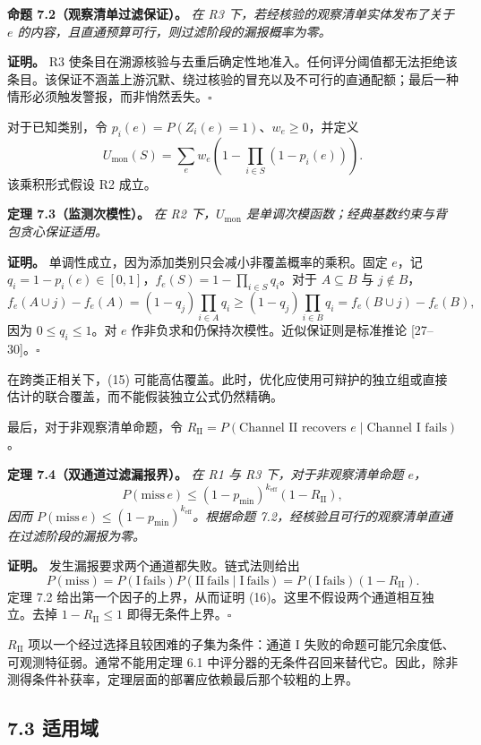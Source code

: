 \documentclass[
  chinese,
  11pt]{article}
\begin{document}
\textbf{命题 7.2（观察清单过滤保证）。} \emph{在 R3 下，若经核验的观察清单实体发布了关于 \(e\) 的内容，且直通预算可行，则过滤阶段的漏报概率为零。}

\textbf{证明。} R3 使条目在溯源核验与去重后确定性地准入。任何评分阈值都无法拒绝该条目。该保证不涵盖上游沉默、绕过核验的冒充以及不可行的直通配额；最后一种情形必须触发警报，而非悄然丢失。\(\square\)

对于已知类别，令 \(p_i(e)=P(Z_i(e)=1)\)、\(w_e\geq0\)，并定义 \[
U_{\mathrm{mon}}(S)=\sum_ew_e\left(1-\prod_{i\in S}(1-p_i(e))\right).
\tag{15}
\] 该乘积形式假设 R2 成立。

\textbf{定理 7.3（监测次模性）。} \emph{在 R2 下，\(U_{\mathrm{mon}}\) 是单调次模函数；经典基数约束与背包贪心保证适用。}

\textbf{证明。} 单调性成立，因为添加类别只会减小非覆盖概率的乘积。固定 \(e\)，记 \(q_i=1-p_i(e)\in[0,1]\)，\(f_e(S)=1-\prod_{i\in S}q_i\)。对于 \(A\subseteq B\) 与 \(j\notin B\)， \[
f_e(A\cup j)-f_e(A)=(1-q_j)\prod_{i\in A}q_i
\geq(1-q_j)\prod_{i\in B}q_i
=f_e(B\cup j)-f_e(B),
\] 因为 \(0\leq q_i\leq1\)。对 \(e\) 作非负求和仍保持次模性。近似保证则是标准推论 {[}27--30{]}。\(\square\)

在跨类正相关下，(15) 可能高估覆盖。此时，优化应使用可辩护的独立组或直接估计的联合覆盖，而不能假装独立公式仍然精确。

最后，对于非观察清单命题，令 \(R_{\mathrm{II}}=P(\text{Channel II recovers }e\mid\text{Channel I fails})\)。

\textbf{定理 7.4（双通道过滤漏报界）。} \emph{在 R1 与 R3 下，对于非观察清单命题 \(e\)，} \[
P(\mathrm{miss}\,e)\leq(1-p_{\min})^{k_{\mathrm{eff}}}(1-R_{\mathrm{II}}),
\tag{16}
\] \emph{因而 \(P(\mathrm{miss}\,e)\leq(1-p_{\min})^{k_{\mathrm{eff}}}\)。根据命题 7.2，经核验且可行的观察清单直通在过滤阶段的漏报为零。}

\textbf{证明。} 发生漏报要求两个通道都失败。链式法则给出 \[
P(\mathrm{miss})=P(\mathrm{I\ fails})P(\mathrm{II\ fails}\mid\mathrm{I\ fails})
=P(\mathrm{I\ fails})(1-R_{\mathrm{II}}).
\] 定理 7.2 给出第一个因子的上界，从而证明 (16)。这里不假设两个通道相互独立。去掉 \(1-R_{\mathrm{II}}\leq1\) 即得无条件上界。\(\square\)

\(R_{\mathrm{II}}\) 项以一个经过选择且较困难的子集为条件：通道 I 失败的命题可能冗余度低、可观测特征弱。通常不能用定理 6.1 中评分器的无条件召回来替代它。因此，除非测得条件补获率，定理层面的部署应依赖最后那个较粗的上界。

\subsection{7.3 适用域}\label{ux9002ux7528ux57df}
\end{document}

